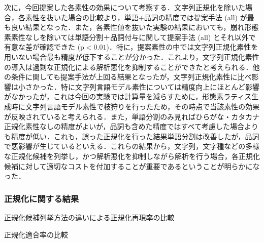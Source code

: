 \documentclass[japanese]{jnlp_1.4}
\begin{document}
次に，今回提案した各素性の効果について考察する．文字列正規化を除いた場合，各素性を抜いた場合の比較より，単語+品詞の精度では提案手法 (all) が最も良い結果となった．また，各素性値を抜いた実験の結果においても，崩れ形態素素性なしを除いては単語分割＋品詞付与に関して提案手法 (all) とそれ以外で有意な差が確認できた ($\mathrm{p} < 0.01$)．特に，提案素性の中では文字列正規化素性を用いない場合最も精度が低下することが分かった．これより，文字列正規化素性の導入は過剰な正規化による解析悪化を抑制することができたと考えられる．他の条件に関しても提案手法が上回る結果となったが，文字列正規化素性に比べ影響は小さかった．特に文字列言語モデル素性については精度向上にほとんど影響がなかったが，これは今回の実験では計算量を減らすために，形態素ラティス生成時に文字列言語モデル素性で枝狩りを行ったため，その時点で当該素性の効果が反映されていると考えられる．また，単語分割のみ見ればひらがな・カタカナ正規化素性なしの精度がよいが，品詞も含めた精度ではすべて考慮した場合よりも精度が低い．これも，誤った正規化を行った結果単語分割は改善したが，品詞で悪影響が生じているといえる．これらの結果から，文字列，文字種などの多様な正規化候補を列挙し，かつ解析悪化を抑制しながら解析を行う場合，各正規化候補に対して適切なコストを付加することが重要であるということが明らかになった．


\subsubsection{正規化に関する結果}

\begin{table}[t]
\caption{正規化候補列挙方法の違いによる正規化再現率の比較}
\label{tab:rec_norm}

\end{table}

\begin{table}[t]
\caption{正規化適合率の比較}
\label{tab:prec_norm}

\end{table}
\end{document}
